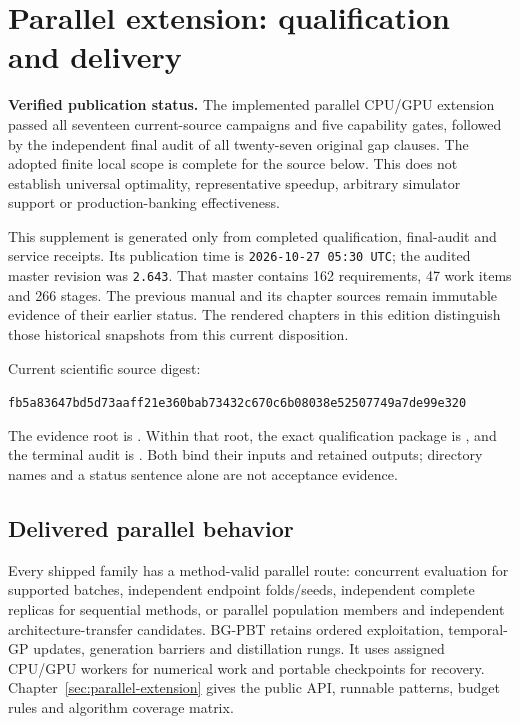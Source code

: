 \chapter{Parallel extension: qualification and delivery}
\label{sec:parallel-delivery}
\begin{decisions}
\textbf{Verified publication status.} The implemented parallel CPU/GPU
extension passed all seventeen current-source campaigns and five
capability gates, followed by the independent final audit of all twenty-seven
original gap clauses. The adopted finite local scope is complete for the
source below. This does not establish universal optimality, representative
speedup, arbitrary simulator support or production-banking effectiveness.
\end{decisions}

This supplement is generated only from completed qualification, final-audit
and service receipts. Its publication time is \texttt{2026-10-27 05:30 UTC}; the audited
master revision was \texttt{2.643}. That master contains 162
requirements, 47 work items and 266 stages. The previous manual and
its chapter sources remain immutable evidence of their earlier status. The
rendered chapters in this edition distinguish those historical snapshots from
this current disposition.

Current scientific source digest:
\begin{center}\small\texttt{fb5a83647bd5d73aaff21e360bab73432c670c6b08038e52507749a7de99e320}\end{center}
The evidence root is .
Within that root, the exact qualification package is
, and the terminal
audit is .
Both bind their inputs and retained outputs; directory names and a status
sentence alone are not acceptance evidence.

\section{Delivered parallel behavior}
Every shipped family has a method-valid parallel route: concurrent evaluation
for supported batches, independent endpoint folds/seeds, independent complete
replicas for sequential methods, or parallel population members and independent
architecture-transfer candidates. BG-PBT retains ordered exploitation,
temporal-GP updates, generation barriers and distillation rungs. It uses
assigned CPU/GPU workers for numerical work and portable checkpoints for
recovery. Chapter~\ref{sec:parallel-extension} gives the public API, runnable
patterns, budget rules and algorithm coverage matrix.

